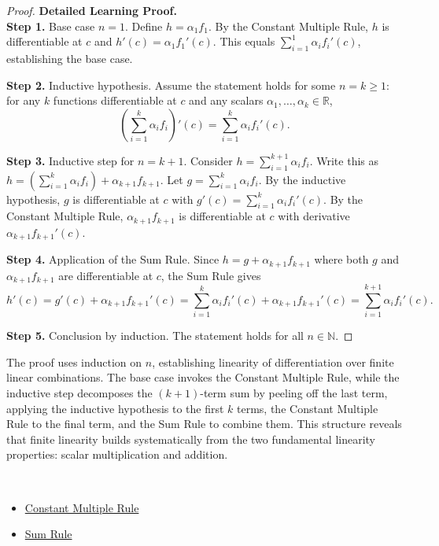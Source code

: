 \begin{proof}
\textbf{Detailed Learning Proof.}~\\

\textbf{Step 1.} Base case $n = 1$. Define $h = \alpha_1 f_1$. By the Constant Multiple Rule, $h$ is differentiable at $c$ and $h'(c) = \alpha_1 f_1'(c)$. This equals $\sum_{i=1}^{1} \alpha_i f_i'(c)$, establishing the base case.

\textbf{Step 2.} Inductive hypothesis. Assume the statement holds for some $n = k \geq 1$: for any $k$ functions differentiable at $c$ and any scalars $\alpha_1, \ldots, \alpha_k \in \mathbb{R}$,
\[
\left(\sum_{i=1}^{k} \alpha_i f_i\right)'(c) = \sum_{i=1}^{k} \alpha_i f_i'(c).
\]

\textbf{Step 3.} Inductive step for $n = k+1$. Consider $h = \sum_{i=1}^{k+1} \alpha_i f_i$. Write this as $h = \left(\sum_{i=1}^{k} \alpha_i f_i\right) + \alpha_{k+1} f_{k+1}$. Let $g = \sum_{i=1}^{k} \alpha_i f_i$. By the inductive hypothesis, $g$ is differentiable at $c$ with $g'(c) = \sum_{i=1}^{k} \alpha_i f_i'(c)$. By the Constant Multiple Rule, $\alpha_{k+1} f_{k+1}$ is differentiable at $c$ with derivative $\alpha_{k+1} f_{k+1}'(c)$.

\textbf{Step 4.} Application of the Sum Rule. Since $h = g + \alpha_{k+1} f_{k+1}$ where both $g$ and $\alpha_{k+1} f_{k+1}$ are differentiable at $c$, the Sum Rule gives
\[
h'(c) = g'(c) + \alpha_{k+1} f_{k+1}'(c) = \sum_{i=1}^{k} \alpha_i f_i'(c) + \alpha_{k+1} f_{k+1}'(c) = \sum_{i=1}^{k+1} \alpha_i f_i'(c).
\]

\textbf{Step 5.} Conclusion by induction. The statement holds for all $n \in \mathbb{N}$.
\end{proof}

\begin{remark*}
The proof uses induction on $n$, establishing linearity of differentiation over finite linear combinations. The base case invokes the Constant Multiple Rule, while the inductive step decomposes the $(k+1)$-term sum by peeling off the last term, applying the inductive hypothesis to the first $k$ terms, the Constant Multiple Rule to the final term, and the Sum Rule to combine them. This structure reveals that finite linearity builds systematically from the two fundamental linearity properties: scalar multiplication and addition.
\end{remark*}

\begin{remark*}[Dependencies]~\\
\begin{itemize}
  \item \hyperref[thm:constant-multiple-rule]{Constant Multiple Rule}
  \item \hyperref[thm:sum-rule]{Sum Rule}
\end{itemize}
\end{remark*}
